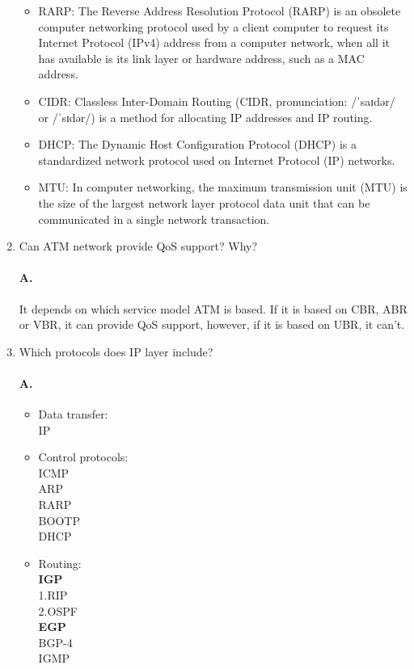 \documentclass[]{article}
\begin{document}
\begin{enumerate}
\begin{itemize}
		\item RARP: The Reverse Address Resolution Protocol (RARP) is an obsolete computer networking protocol used by a client computer to request its Internet Protocol (IPv4) address from a computer network, when all it has available is its link layer or hardware address, such as a MAC address. 
		\item CIDR: Classless Inter-Domain Routing (CIDR, pronunciation: /ˈsaɪdər/ or /ˈsɪdər/) is a method for allocating IP addresses and IP routing. 
		\item DHCP: The Dynamic Host Configuration Protocol (DHCP) is a standardized network protocol used on Internet Protocol (IP) networks. 
		\item MTU: In computer networking, the maximum transmission unit (MTU) is the size of the largest network layer protocol data unit that can be communicated in a single network transaction.
	\end{itemize}
	
	\item Can ATM network provide QoS support? Why?
	\paragraph{A.}
	It depends on which service model ATM is based. If it is based on CBR, ABR or VBR, it can provide QoS support, however, if it is based on UBR, it can't.
	
	\item Which protocols does IP layer include?
	\paragraph{A.}
	\begin{itemize}
		\item
		Data transfer:\\
		IP
		\item
		Control protocols:\\
		ICMP\\
		ARP\\
		RARP\\
		BOOTP\\
		DHCP
		\item 
		Routing:\\
		\textbf{IGP}\\
		1.RIP\\
		2.OSPF\\
		\textbf{EGP}\\
		BGP-4\\
		IGMP
	\end{itemize}
	

\end{enumerate}
\end{document}
